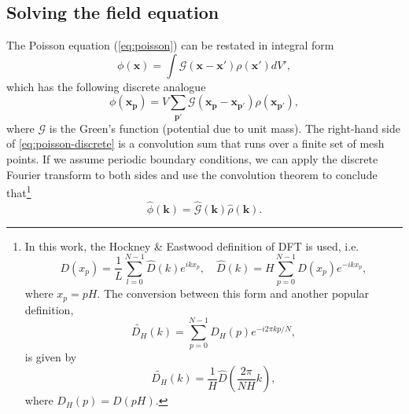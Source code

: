 \subsection{Solving the field equation}
The Poisson equation (\autoref{eq:poisson}) can be restated in integral form
\begin{equation*}
    \phi(\mathbf{x}) = \int \mathcal{G}(\mathbf{x}-\mathbf{x}')\rho(\mathbf{x}') dV',
\end{equation*}
which has the following discrete analogue
\begin{equation}\label{eq:poisson-discrete}
    \phi(\mathbf{x}_\mathbf{p}) = V \sum_{\mathbf{p}'} \mathcal{G}(\mathbf{x}_\mathbf{p} - \mathbf{x}_{\mathbf{p}'}) \rho(\mathbf{x}_{\mathbf{p}'}),
\end{equation}
where $\mathcal{G}$ is the Green's function (potential due to unit mass).
The right-hand side of \autoref{eq:poisson-discrete} is a convolution sum that runs over a finite set of mesh points.
If we assume periodic boundary conditions, we can apply the discrete Fourier transform to both sides and use the convolution theorem to conclude that\footnote{
    In this work, the Hockney \& Eastwood definition of DFT is used, i.e.
    \begin{equation*}
        D(x_p) = \frac{1}{L}\sum_{l=0}^{N-1}\hat{D}(k)e^{ikx_p}, \quad \hat{D}(k) = H\sum_{p=0}^{N-1}D(x_p)e^{-ikx_p},
    \end{equation*}
    where $x_p = pH$.
    The conversion between this form and another popular definition,
    \begin{equation}\label{eq:standard-dft}
        \widetilde{D_H}(k) = \sum_{p=0}^{N-1}D_H(p)e^{-i2\pi kp / N},
    \end{equation}
    is given by
    \begin{equation*}
        \widetilde{D_H}(k) = \frac{1}{H}\hat{D}\left(\frac{2\pi}{NH}k\right),
    \end{equation*}
    where $D_H(p) = D(pH)$.
}
\begin{equation}\label{eq:poisson-fourier-product}
    \hat{\phi}(\mathbf{k}) = \hat{\mathcal{G}}(\mathbf{k}) \hat{\rho}(\mathbf{k}).
\end{equation}

